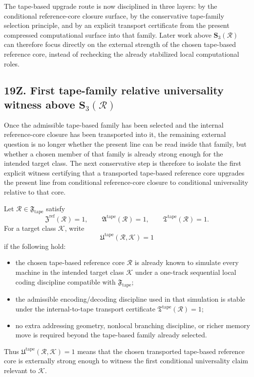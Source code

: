 \begin{corollary}
The tape-based upgrade route is now disciplined in three layers: by the conditional reference-core closure surface, by the conservative tape-family selection principle, and by an explicit transport certificate from the present compressed computational surface into that family. Later work above \(\mathbf S_3(\mathcal R)\) can therefore focus directly on the external strength of the chosen tape-based reference core, instead of rechecking the already stabilized local computational roles.
\end{corollary}


\subsection*{19Z. First tape-family relative universality witness above \(\mathbf S_3(\mathcal R)\)}
Once the admissible tape-based family has been selected and the internal reference-core closure has been transported into it, the remaining external question is no longer whether the present line can be read inside that family, but whether a chosen member of that family is already strong enough for the intended target class. The next conservative step is therefore to isolate the first explicit witness certifying that a transported tape-based reference core upgrades the present line from conditional reference-core closure to conditional universality relative to that core.

\begin{definition}
Let \(\mathcal R\in\mathfrak F_{\mathrm{tape}}\) satisfy
\[
\mathfrak Z^{\mathrm{ref}}(\mathcal R)=1,
\qquad
\mathfrak A^{\mathrm{tape}}(\mathcal R)=1,
\qquad
\mathfrak T^{\mathrm{tape}}(\mathcal R)=1.
\]
For a target class \(\mathcal K\), write
\[
\mathfrak U^{\mathrm{tape}}(\mathcal R,\mathcal K)=1
\]
if the following hold:
\begin{itemize}[leftmargin=2em]
 \item the chosen tape-based reference core \(\mathcal R\) is already known to simulate every machine in the intended target class \(\mathcal K\) under a one-track sequential local coding discipline compatible with \(\mathfrak F_{\mathrm{tape}}\);
 \item the admissible encoding/decoding discipline used in that simulation is stable under the internal-to-tape transport certificate \(\mathfrak T^{\mathrm{tape}}(\mathcal R)=1\);
 \item no extra addressing geometry, nonlocal branching discipline, or richer memory move is required beyond the tape-based family already selected.
\end{itemize}
Thus \(\mathfrak U^{\mathrm{tape}}(\mathcal R,\mathcal K)=1\) means that the chosen transported tape-based reference core is externally strong enough to witness the first conditional universality claim relevant to \(\mathcal K\).
\end{definition}

